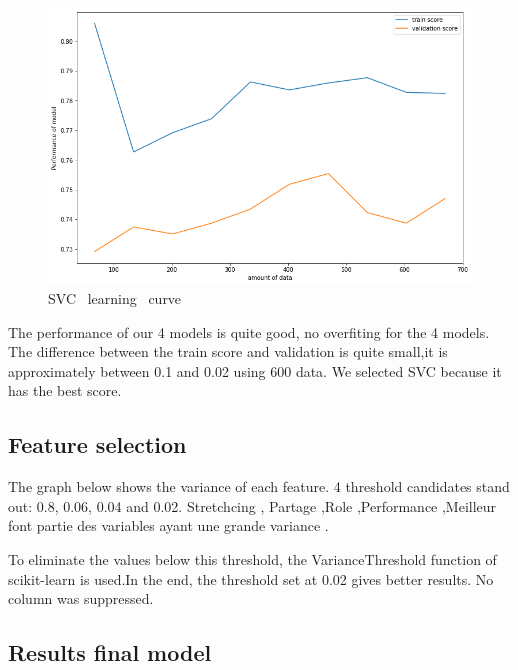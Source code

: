 \documentclass[12pt]{article}
\begin{document}
\begin{figure}[H]
\begin{center}
\includegraphics[scale=0.5]{learning_curve_4.png} 
\caption[]{ SVC \ learning \ curve }
\end{center}
\end{figure}


The performance of our 4 models is quite good, no overfiting for the 4 models. The difference between the train score and validation is quite small,it is approximately between 0.1 and 0.02 using 600 data. We selected SVC because it has the best score.

\vspace{0.2 cm}



  
\subsection{Feature selection} 


\noindent The graph below shows the variance of each feature. 
 4 threshold candidates stand out: 0.8, 0.06, 0.04 and 0.02.
Stretchcing , Partage ,Role ,Performance ,Meilleur font partie des variables ayant une grande variance .



\noindent To eliminate the values below this threshold, the VarianceThreshold function of scikit-learn is used.In the end, the threshold set at 0.02 gives better results. No column was suppressed. 

\subsection{Results final model} 
\end{document}
